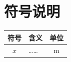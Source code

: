 \section{符号说明}

\begin{table}[htbp]
  \centering
  \small
  \begin{tabular}{clc}
    \toprule
    符号 & 含义 & 单位 \\
    \midrule
    $x$ & …… & m \\
    \bottomrule
  \end{tabular}
\end{table}

